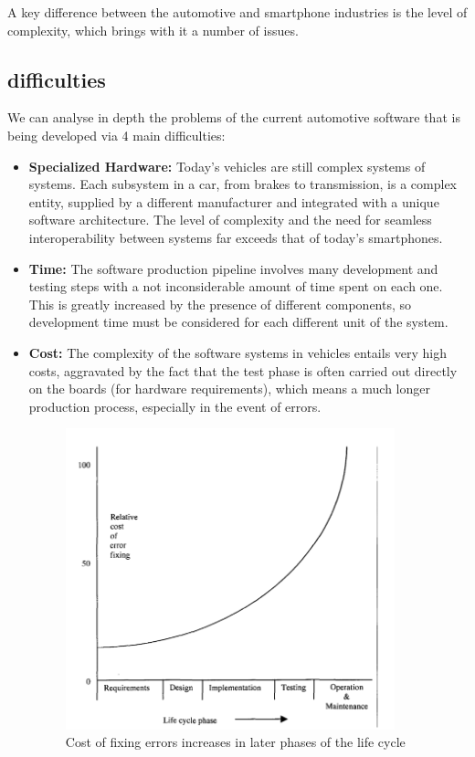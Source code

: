 A key difference between the automotive and smartphone industries is the level of complexity, which brings with it a number of issues.

\subsection{difficulties}
We can analyse in depth the problems of the current automotive software that is being developed via 4 main difficulties:

\begin{itemize}
    \item \textbf{Specialized Hardware:} Today's vehicles are still complex systems of systems. Each subsystem in a car, from brakes to transmission, is a complex entity, supplied by a different manufacturer and integrated with a unique software architecture. The level of complexity and the need for seamless interoperability between systems far exceeds that of today's smartphones.
    \item \textbf{Time:} The software production pipeline involves many development and testing steps with a not inconsiderable amount of time spent on each one. This is greatly increased by the presence of different components, so development time must be considered for each different unit of the system.
    \item \textbf{Cost:} The complexity of the software systems in vehicles entails very high costs, aggravated by the fact that the test phase is often carried out directly on the boards (for hardware requirements), which means a much longer production process, especially in the event of errors.
    
    \begin{figure}[h]  %
        \centering
        \includegraphics[width=0.9\textwidth]{images/costs_of_errors_correction_in_software_development.png}  %
        \caption{Cost of fixing errors increases in later phases of the life cycle \cite{CostsOfSoftwareDeveloping}}
        \label{fig:WorldAutomobileProduction}
      \end{figure}


\end{itemize}
